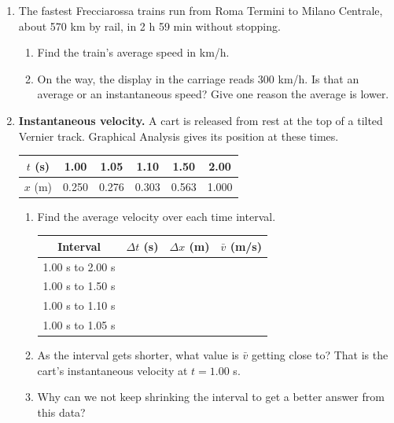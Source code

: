 \documentclass[12pt, twoside]{article}
\begin{document}
\begin{enumerate}[itemsep=0.5cm]
\item The fastest Frecciarossa trains run from Roma Termini to Milano Centrale,
  about 570 km by rail, in 2 h 59 min without stopping.
  \begin{enumerate}[itemsep=1.5cm]
    \item Find the train's average speed in km/h.
    \item On the way, the display in the carriage reads 300 km/h. Is that an average
      or an instantaneous speed? Give one reason the average is lower.
  \end{enumerate}

\newpage

\item \textbf{Instantaneous velocity.} A cart is released from rest at the top of a
  tilted Vernier track. Graphical Analysis gives its position at these times.

  \begin{center}
  \renewcommand{\arraystretch}{1.3}
  \begin{tabular}{| c | c | c | c | c | c |}
    \hline
    $t$ (s) & 1.00 & 1.05 & 1.10 & 1.50 & 2.00 \\ \hline
    $x$ (m) & 0.250 & 0.276 & 0.303 & 0.563 & 1.000 \\ \hline
  \end{tabular}
  \end{center}

  \begin{enumerate}[itemsep=0.4cm]
    \item Find the average velocity over each time interval.

      \vspace{0.1cm}
      \renewcommand{\arraystretch}{1.4}
      \begin{tabular}{| c | c | c | p{3.6cm} |}
        \hline
        Interval & $\Delta t$ (s) & $\Delta x$ (m) & $\bar{v}$ (m/s) \\ \hline
        1.00 s to 2.00 s & & & \\ \hline
        1.00 s to 1.50 s & & & \\ \hline
        1.00 s to 1.10 s & & & \\ \hline
        1.00 s to 1.05 s & & & \\ \hline
      \end{tabular}
    \item As the interval gets shorter, what value is $\bar{v}$ getting close to?
      That is the cart's instantaneous velocity at $t = 1.00$ s. \vspace{0.5cm}
    \item Why can we not keep shrinking the interval to get a better answer from
      this data? \vspace{0.3cm}
  \end{enumerate}


\end{enumerate}
\end{document}
